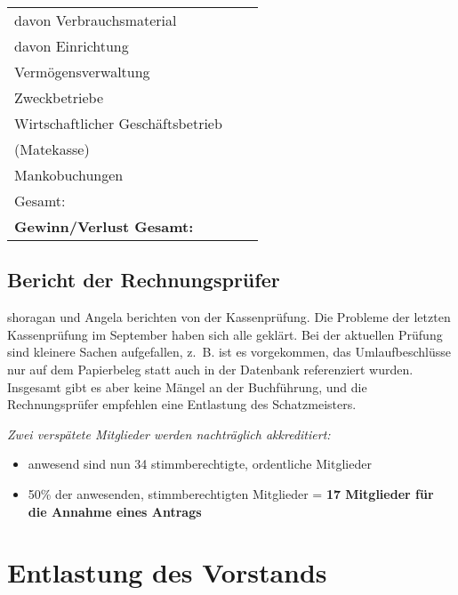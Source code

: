 \documentclass{s0minutes}
\begin{document}
\begin{longtable}{lr>{\textcolor{red}\bgroup}r<{\egroup}}
  \quad davon Verbrauchsmaterial    &               &                \\
  \quad davon Einrichtung           &               &                \\
  \midrule
  Vermögensverwaltung               &               &                \\
  \midrule
  Zweckbetriebe                     &               &                \\
  \midrule
  Wirtschaftlicher Geschäftsbetrieb &               &                \\
  \quad (Matekasse) && \\
  \midrule
  Mankobuchungen                    &               &                \\
  \midrule\midrule
  Gesamt:                           &               &                \\

  \textbf{Gewinn/Verlust Gesamt:}   &               &                \\
\end{longtable}

\subsection{Bericht der Rechnungsprüfer}

shoragan und Angela berichten von der Kassenprüfung. Die Probleme der letzten
Kassenprüfung im September haben sich alle geklärt. Bei der aktuellen Prüfung
sind kleinere Sachen aufgefallen, z.~B. ist es vorgekommen, das Umlaufbeschlüsse
nur auf dem Papierbeleg statt auch in der Datenbank referenziert wurden.
Insgesamt gibt es aber keine Mängel an der Buchführung, und die Rechnungsprüfer
empfehlen eine Entlastung des Schatzmeisters.

{ \itshape \vspace{2\baselineskip}
  Zwei verspätete Mitglieder werden nachträglich akkreditiert:
  \begin{itemize}[nosep]
    \item anwesend sind nun 34 stimmberechtigte, ordentliche Mitglieder
    \item 50\% der anwesenden, stimmberechtigten Mitglieder = \textbf{17 Mitglieder 
      für die Annahme eines Antrags}
  \end{itemize}
}

\section{Entlastung des Vorstands}
\end{document}
